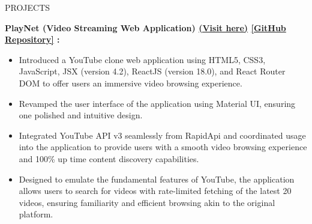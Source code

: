 \documentclass{resume} %
\begin{document}
\begin{rSection}{PROJECTS}
    \item \textbf{PlayNet (Video Streaming Web Application)
    {\href{https://play-net-eight.vercel.app/}{(Visit here)}}
    {\href{https://github.com/arkapg211002/PlayNet}{[GitHub Repository]}} :} 
    \vspace{-0.6em}
    \begin{itemize}
    \setlength\itemsep{-0.6em}
     \item Introduced  a  YouTube  clone  web  application  using  HTML5,  CSS3,  JavaScript,  JSX  (version  4.2),  ReactJS (version 18.0), and React Router DOM to offer users an immersive video browsing experience.
    \item Revamped the user interface of the application using Material UI, ensuring one polished and intuitive design.
    \item Integrated  YouTube  API  v3  seamlessly from RapidApi and coordinated usage into  the  application  to  provide  users  with  a  smooth  video  browsing experience and 100\% up time content discovery capabilities.
    \item Designed  to  emulate  the  fundamental  features  of  YouTube,  the  application  allows  users  to  search  for  videos with rate-limited fetching of the latest 20 videos, ensuring familiarity and efficient browsing akin to the original platform.
    \end{itemize}
    

  
\end{rSection}
\end{document}
